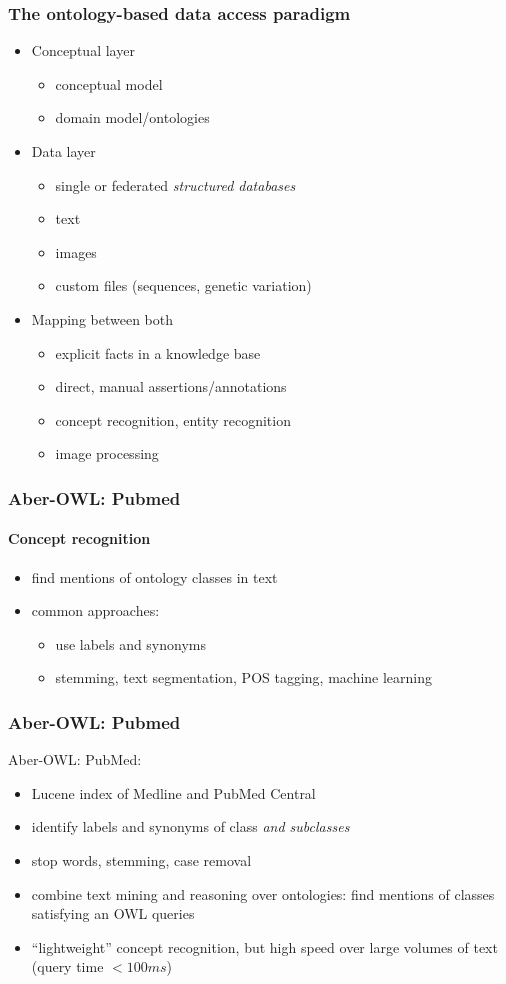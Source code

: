 \documentclass{beamer}
\renewcommand{\em}{\itshape}
\begin{document}
\begin{frame}
  \frametitle{The ontology-based data access paradigm}
  \begin{itemize}
  \item<0> Conceptual layer
    \begin{itemize}
    \item conceptual model
    \item domain model/ontologies
    \end{itemize}
  \item<0> Data layer
    \begin{itemize}
    \item single or federated {\em structured databases}
    \item text
    \item images
    \item custom files (sequences, genetic variation)
    \end{itemize}
  \item<1,2> Mapping between both
    \begin{itemize}
    \item<1> explicit facts in a knowledge base
    \item<1> direct, manual assertions/annotations
    \item<2> concept recognition, entity recognition
    \item<0> image processing
    \end{itemize}
  \end{itemize}
\end{frame}

\begin{frame}
  \frametitle{Aber-OWL: Pubmed}
  \framesubtitle{Concept recognition}
  \begin{itemize}
  \item find mentions of ontology classes in text
  \item common approaches:
    \begin{itemize}
    \item use labels and synonyms
    \item stemming, text segmentation, POS tagging, machine learning
    \end{itemize}
  \end{itemize}
\end{frame}

\begin{frame}
  \frametitle{Aber-OWL: Pubmed}
  Aber-OWL: PubMed: 
  \begin{itemize}
  \item Lucene index of Medline and PubMed Central
  \item identify labels and synonyms of class {\em and subclasses}
  \item stop words, stemming, case removal
  \item combine text mining and reasoning over ontologies: find
    mentions of classes satisfying an OWL queries
  \item ``lightweight'' concept recognition, but high speed over
    large volumes of text (query time $<100ms$)
  \end{itemize}
\end{frame}
\end{document}

